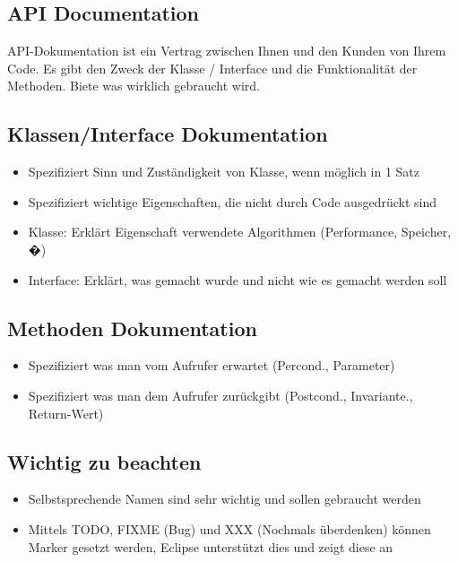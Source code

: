 \documentclass[a4paper,10pt]{article}
\begin{document}
\subsection{API Documentation}
API-Dokumentation ist ein Vertrag zwischen Ihnen und den Kunden von Ihrem Code. Es gibt den Zweck der Klasse / Interface und die Funktionalit\"{a}t der Methoden. Biete was wirklich gebraucht wird.

\subsection{Klassen/Interface Dokumentation}
\begin{itemize}
	\item Spezifiziert Sinn und Zust\"{a}ndigkeit von Klasse, wenn m\"{o}glich in 1 Satz
	\item Spezifiziert wichtige Eigenschaften, die nicht durch Code ausgedr\"{u}ckt sind
	\item Klasse: Erkl\"{a}rt Eigenschaft verwendete Algorithmen (Performance, Speicher, �)
	\item Interface: Erkl\"{a}rt, was gemacht wurde und nicht wie es gemacht werden soll
\end{itemize}

\subsection{Methoden Dokumentation}
\begin{itemize}
	\item Spezifiziert was man vom Aufrufer erwartet (Percond., Parameter)
	\item Spezifiziert was man dem Aufrufer zur\"{u}ckgibt (Postcond., Invariante., Return-Wert)
\end{itemize}

\subsection{Wichtig zu beachten}
\begin{itemize}
\item Selbstsprechende Namen sind sehr wichtig und sollen gebraucht werden
\item Mittels TODO, FIXME (Bug) und XXX (Nochmals \"{u}berdenken) k\"{o}nnen Marker gesetzt werden, Eclipse unterst\"{u}tzt dies und zeigt diese an
\end{itemize}
\end{document}
